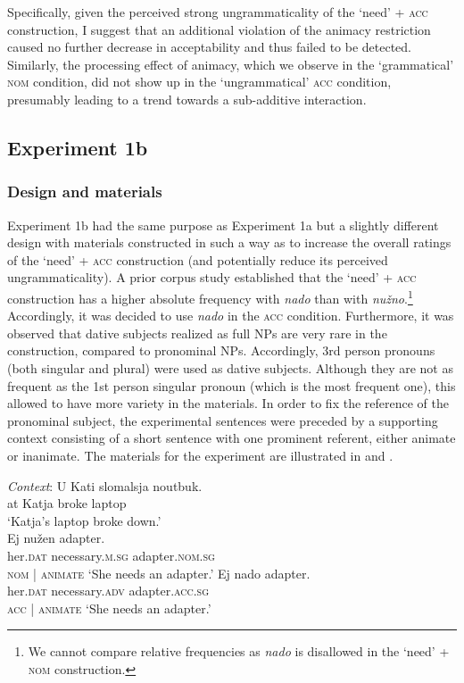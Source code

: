 \documentclass[output=paper]{langscibook}
\begin{document}
Specifically, given the perceived strong ungrammaticality of the `need' + \textsc{acc} construction, I suggest that an additional violation of the animacy restriction caused no further decrease in acceptability and thus failed to be detected. Similarly, the processing effect of animacy, which we observe in the `grammatical' \textsc{nom} condition, did not show up in the `ungrammatical' \textsc{acc} condition, presumably leading to a trend towards a sub-additive interaction.

\subsection{Experiment 1b}

\subsubsection{Design and materials}

Experiment 1b had the same purpose as Experiment 1a but a slightly different design with materials constructed in such a way as to increase the overall ratings of the `need' + \textsc{acc} construction (and potentially reduce its perceived ungrammaticality). A prior corpus study established that the `need' + \textsc{acc} construction has a higher absolute frequency with \textit{nado} than with \textit{nužno}.\footnote{We cannot compare relative frequencies as \textit{nado} is disallowed in the `need' + \textsc{nom} construction.} Accordingly, it was decided to use \textit{nado} in the \textsc{acc} condition. Furthermore, it was observed that dative subjects realized as full NPs are very rare in the construction, compared to pronominal NPs. Accordingly, 3rd person pronouns (both singular and plural) were used as dative subjects. Although they are not as frequent as the 1st person singular pronoun (which is the most frequent one), this allowed to have more variety in the materials. In order to fix the reference of the pronominal subject, the experimental sentences were preceded by a supporting context consisting of a short sentence with one prominent referent, either animate or inanimate. The materials for the experiment are illustrated in  and .

\ea \label{materials-exp1b-anim} \gll \textit{Context}: U Kati slomalsja noutbuk.
\\
{} at Katja broke laptop\\
\glt \hspace{1.3cm} `Katja's laptop broke down.'\\
\ea \gll Ej nužen adapter.\\
her.\textsc{dat} necessary.\textsc{m.sg} adapter.\textsc{nom.sg}\\ \hfill \textsc{nom} | \textsc{animate}
\glt `She needs an adapter.'
\ex \gll Ej nado adapter.\\
her.\textsc{dat} necessary.\textsc{adv} adapter.\textsc{acc.sg}\\ \hfill \textsc{acc} | \textsc{animate}
\glt `She needs an adapter.'
\z \z
\end{document}
